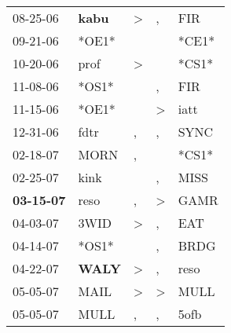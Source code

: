 \begin{supertabular}{p{0.07\textwidth}p{0.06\textwidth}p{0.02\textwidth}p{0.02\textwidth}p{0.06\textwidth}}
          08-25-06\textsuperscript{} &  \textbf{kabu\textsuperscript{}} &     \textgreater &                , &            FIR\textsuperscript{} \\
          09-21-06\textsuperscript{} &                            *OE1* &                  &                  &                            *CE1* \\
          10-20-06\textsuperscript{} &           prof\textsuperscript{} &     \textgreater &                  &                            *CS1* \\
          11-08-06\textsuperscript{} &                            *OS1* &                  &                , &            FIR\textsuperscript{} \\
          11-15-06\textsuperscript{} &                            *OE1* &                  &     \textgreater &           iatt\textsuperscript{} \\
          12-31-06\textsuperscript{} &           fdtr\textsuperscript{} &                , &                , &           SYNC\textsuperscript{} \\
          02-18-07\textsuperscript{} &           MORN\textsuperscript{} &                , &                  &                            *CS1* \\
          02-25-07\textsuperscript{} &           kink\textsuperscript{} &                  &                , &           MISS\textsuperscript{} \\
 \textbf{03-15-07\textsuperscript{}} &           reso\textsuperscript{} &                , &     \textgreater &           GAMR\textsuperscript{} \\
          04-03-07\textsuperscript{} &           3WID\textsuperscript{} &     \textgreater &                , &            EAT\textsuperscript{} \\
          04-14-07\textsuperscript{} &                            *OS1* &                  &                , &           BRDG\textsuperscript{} \\
          04-22-07\textsuperscript{} &  \textbf{WALY\textsuperscript{}} &     \textgreater &                , &           reso\textsuperscript{} \\
          05-05-07\textsuperscript{} &           MAIL\textsuperscript{} &     \textgreater &     \textgreater &           MULL\textsuperscript{} \\
          05-05-07\textsuperscript{} &           MULL\textsuperscript{} &                , &                , &           5ofb\textsuperscript{} \\

\end{supertabular}
